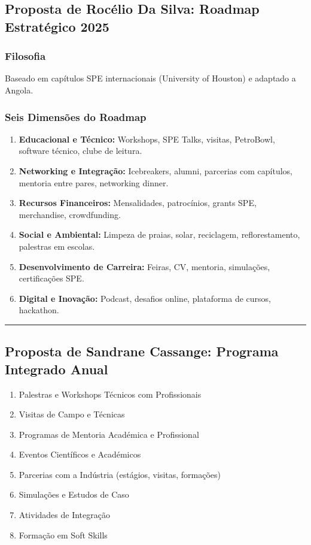 \documentclass[12pt,a4paper]{article}
\newcommand{\proposalsep}{%
  \vspace{6pt}%
  {\color{gold}\rule{0.35\linewidth}{0.7pt}}%
  \vspace{4pt}%
}
\begin{document}
\subsection{Proposta de Rocélio Da Silva: Roadmap Estratégico 2025}

\subsubsection*{Filosofia}
Baseado em capítulos SPE internacionais (University of Houston) e adaptado a Angola.

\subsubsection*{Seis Dimensões do Roadmap}
\begin{enumerate}
    \item \textbf{Educacional e Técnico:} Workshops, SPE Talks, visitas, PetroBowl, software técnico, clube de leitura.
    \item \textbf{Networking e Integração:} Icebreakers, alumni, parcerias com capítulos, mentoria entre pares, networking dinner.
    \item \textbf{Recursos Financeiros:} Mensalidades, patrocínios, grants SPE, merchandise, crowdfunding.
    \item \textbf{Social e Ambiental:} Limpeza de praias, solar, reciclagem, reflorestamento, palestras em escolas.
    \item \textbf{Desenvolvimento de Carreira:} Feiras, CV, mentoria, simulações, certificações SPE.
    \item \textbf{Digital e Inovação:} Podcast, desafios online, plataforma de cursos, hackathon.
\end{enumerate}

\proposalsep

\subsection{Proposta de Sandrane Cassange: Programa Integrado Anual}

\begin{enumerate}
    \item Palestras e Workshops Técnicos com Profissionais
    \item Visitas de Campo e Técnicas
    \item Programas de Mentoria Académica e Profissional
    \item Eventos Científicos e Académicos
    \item Parcerias com a Indústria (estágios, visitas, formações)
    \item Simulações e Estudos de Caso
    \item Atividades de Integração
    \item Formação em Soft Skills
\end{enumerate}
\end{document}
